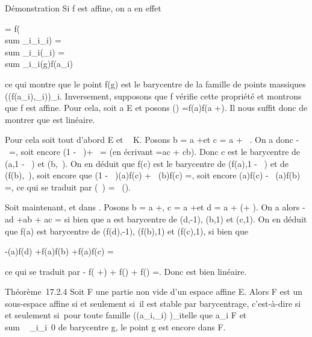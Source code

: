 \documentclass[]{article}
\begin{document}
Démonstration Si f est affine, on a en effet

 =\vec
f(\\sum
_i\inI\lambda_i\overrightarrowga_i)
= \\sum
_i\inI\lambda_i\vecf(\overrightarrowga_i)
= \\sum
_i\inI\lambda_i\overrightarrowf(g)f(a_i)

ce qui montre que le point f(g) est le barycentre de la famille de
points massiques \left
((f(a_i),\lambda_i)\right )_i\inI.
Inversement, supposons que f vérifie cette propriété et montrons que f
est affine. Pour cela, soit a \in E et posons
\vecf(\overrightarrow\xi)
=\overrightarrow f(a)f(a
+\overrightarrow \xi). Il nous suffit donc de montrer
que \vecf est linéaire.

Pour cela soit tout d'abord \overrightarrow\xi
\in\overrightarrow E et \lambda~ \in K. Posons b = a
+\overrightarrow \xi et c = a +
\lambda~\overrightarrow\xi. On a donc
\overrightarrowac -
\lambda~\overrightarrowab =, soit encore (1 - \lambda~)\overrightarrowac +
\lambda~\overrightarrowbc = (en écrivant \overrightarrowab
=\overrightarrow ac +\overrightarrow
cb). Donc c est le barycentre de (a,1 - \lambda~) et (b,\lambda~). On en déduit que
f(c) est le barycentre de (f(a),1 - \lambda~) et de (f(b),\lambda~), soit encore que
(1 - \lambda~)\overrightarrowf(a)f(c) +
\lambda~\overrightarrowf(b)f(c)
=, soit encore
\overrightarrowf(a)f(c) -
\lambda~\overrightarrowf(a)f(b)
=, ce qui se traduit par
\vecf(\lambda~\overrightarrow\xi) =
\lambda~\vecf(\overrightarrow\xi).

Soit maintenant, \overrightarrow\xi et
\overrightarrow\eta dans
\overrightarrowE. Posons b = a
+\overrightarrow \xi, c = a
+\overrightarrow \eta et d = a +
(\overrightarrow\xi +\overrightarrow
\eta). On a alors -\overrightarrow ad
+\overrightarrow ab +\overrightarrow
ac = si bien que a est barycentre
de (d,-1), (b,1) et (c,1). On en déduit que f(a) est barycentre de
(f(d),-1), (f(b),1) et (f(c),1), si bien que

-\overrightarrowf(a)f(d)
+\overrightarrow f(a)f(b)
+\overrightarrow f(a)f(c)
=

ce qui se traduit par -\vec
f(\overrightarrow\xi
+\overrightarrow \eta) +\vec
f(\overrightarrow\xi) +\vec
f(\overrightarrow\eta)
=. Donc \vecf est
bien linéaire.

Théorème~17.2.4 Soit F une partie non vide d'un espace affine E. Alors F
est un sous-espace affine si et seulement si~il est stable par
barycentrage, c'est-à-dire si et seulement si~pour toute famille
\left ((a_i,\lambda_i)\right
)_i\inI telle que a_i \in F et
\\sum ~
_i\inI\lambda_i\neq~0 de barycentre g, le
point g est encore dans F.
\end{document}

